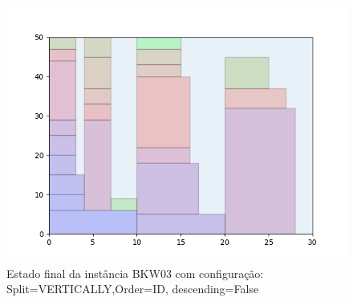 \begin{figure}[H]
    \centering
    \caption[]{Estado final da instância BKW03 com configuração: Split=VERTICALLY,Order=ID, descending=False}
    \label{fig:bkw03-vertically-id-false}
    \includegraphics[scale=0.5]{output/figures/bkw/bkw03/vertically/id/false/00}
\end{figure}